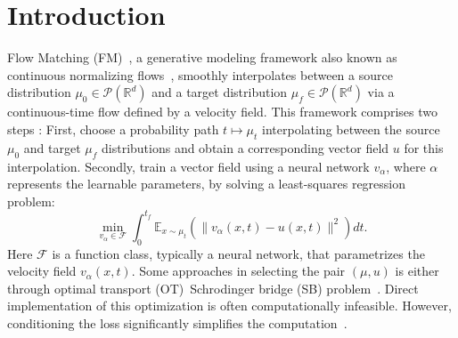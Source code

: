 \documentclass[12pt]{amsart}
\newcommand{\R}{\mathbb{R}}
\newcommand{\map}[3]{#1:#2 \rightarrow #3}
\renewcommand{\(}{\left (}
\renewcommand{\)}{\right )}
\numberwithin{equation}{section}
\begin{document}
\section{Introduction}\label{sec: Introduction}
Flow Matching (FM)~\cite{YL-RTC-HBH-MN-ML:22,MSA-EVE:22,XL-CG-QL:22}, a generative modeling framework also known as continuous normalizing flows~\cite{RTC-YR-JB-DKD:18,WG-RTC-JB-IS-DD:18}, smoothly interpolates between a source distribution $\mu_0 \in \mathcal{P}(\mathbb{R}^d)$ and a target distribution $\mu_f \in \mathcal{P}(\mathbb{R}^d)$ via a continuous-time flow defined by a velocity field. This framework comprises two steps \cite{YL-RTC-HBH-MN-ML:22}: First, choose a probability path $t\mapsto\mu_t$ interpolating between the source $\mu_0$ and target $\mu_f$ distributions and obtain a corresponding vector field $u$ for this interpolation. Secondly, train a vector field using a neural network $v_{\alpha}$, where $\alpha$ represents the learnable parameters, by solving a least-squares regression problem: %
\begin{equation*}%
\min_{v_{\alpha}\in \mathcal{F}}\int_0^{t_f}\mathbb{E}_{x\sim\mu_t}(\|v_{\alpha}(x,t)-u(x,t)\|^2)dt.
\end{equation*}
Here $\mathcal{F}$ is a function class, typically a neural network, that parametrizes the velocity field $v_{\alpha}(x,t)$. Some approaches in selecting the pair $(\mu,u)$ is either through %
optimal transport (OT)\ Schrodinger bridge (SB) problem~\cite{RWB:07,FAB-EZ:12,YC-TTG-MP:16,YC-TTG-MP:16b,YC:23,PDP:91}. Direct implementation of this optimization is often computationally infeasible.  However, conditioning the loss significantly simplifies the computation~\cite{YL-RTC-HBH-MN-ML:22}. %
\end{document}
